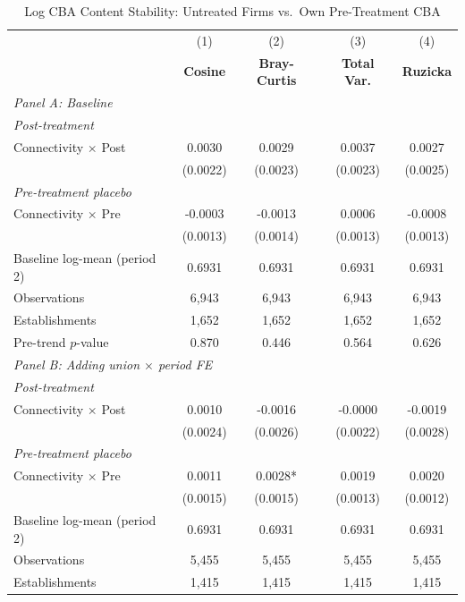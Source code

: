 \begin{table}[H]
\centering
\caption{Log CBA Content Stability: Untreated Firms vs.\ Own Pre-Treatment CBA}
\label{tab:self_ln_cba_similarity}
\scriptsize
\setlength{\tabcolsep}{8pt}
\begin{tabular}{lcccc}
\hline\hline
 & (1) & (2) & (3) & (4) \\
 & \textbf{Cosine} & \textbf{Bray-Curtis} & \textbf{Total Var.} & \textbf{Ruzicka} \\
\hline
\multicolumn{5}{l}{\textit{Panel A: Baseline}} \\
\multicolumn{5}{l}{\textit{Post-treatment}} \\
Connectivity $\times$ Post & 0.0030 & 0.0029 & 0.0037 & 0.0027 \\
 & (0.0022) & (0.0023) & (0.0023) & (0.0025) \\
\multicolumn{5}{l}{\textit{Pre-treatment placebo}} \\
Connectivity $\times$ Pre & -0.0003 & -0.0013 & 0.0006 & -0.0008 \\
 & (0.0013) & (0.0014) & (0.0013) & (0.0013) \\
\hline
Baseline log-mean (period 2) & 0.6931 & 0.6931 & 0.6931 & 0.6931 \\
Observations &        6,943 &        6,943 &        6,943 &        6,943 \\
Establishments &        1,652 &        1,652 &        1,652 &        1,652 \\
Pre-trend $p$-value & 0.870 & 0.446 & 0.564 & 0.626 \\
\hline
\multicolumn{5}{l}{\textit{Panel B: Adding union $\times$ period FE}} \\
\multicolumn{5}{l}{\textit{Post-treatment}} \\
Connectivity $\times$ Post & 0.0010 & -0.0016 & -0.0000 & -0.0019 \\
 & (0.0024) & (0.0026) & (0.0022) & (0.0028) \\
\multicolumn{5}{l}{\textit{Pre-treatment placebo}} \\
Connectivity $\times$ Pre & 0.0011 & 0.0028* & 0.0019 & 0.0020 \\
 & (0.0015) & (0.0015) & (0.0013) & (0.0012) \\
\hline
Baseline log-mean (period 2) & 0.6931 & 0.6931 & 0.6931 & 0.6931 \\
Observations &        5,455 &        5,455 &        5,455 &        5,455 \\
Establishments &        1,415 &        1,415 &        1,415 &        1,415 \\

\end{tabular}
\end{table}
